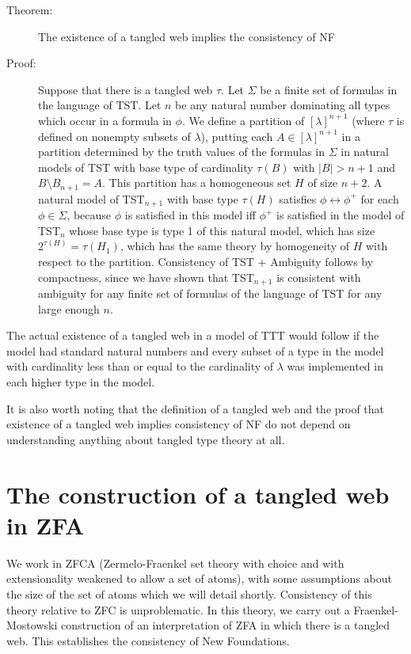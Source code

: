 \documentclass[12pt]{article}
\begin{document}
\begin{description}

\item[Theorem:]  The existence of a tangled web implies the consistency of NF

\item[Proof:]  Suppose that there is a tangled web $\tau$.  Let $\Sigma$ be a finite set of formulas in the language of TST.  Let $n$ be any natural number dominating all types which occur
in a formula in $\phi$.  We define a partition of $[\lambda]^{n+1}$ (where $\tau$ is defined on nonempty subsets of $\lambda$), putting each $A \in [\lambda]^{n+1}$ in a partition
determined by the truth values of the formulas in $\Sigma$ in natural models of TST with base type of cardinality $\tau(B)$ with $|B|>n+1$ and $B \setminus B_{n+1}=A$.  This partition has a homogeneous set $H$ of size $n+2$.  A natural model of TST$_{n+1}$ with base type $\tau(H)$ satisfies $\phi \leftrightarrow \phi^+$ for each $\phi \in \Sigma$, because
$\phi$ is satisfied in this model iff $\phi^+$ is satisfied in the model  of TST$_n$ whose base type is type 1 of this natural model, which has size $2^{\tau(H)} = \tau(H_1)$, which has the same theory by homogeneity of $H$ with respect to the partition.  Consistency of TST + Ambiguity follows by compactness, since we have shown that TST$_{n+1}$ is consistent with ambiguity for any finite set of formulas of the language of TST for any large enough $n$.

\end{description}

The actual existence of a tangled web in a model of TTT would follow if the model had standard natural numbers and every subset of a type in the model with cardinality less than or equal to the cardinality of $\lambda$  was implemented in each higher type in the model.

It is also worth noting that the definition of a tangled web and the proof that existence of a tangled web implies consistency of NF do not depend on understanding anything about tangled type theory at all.

\newpage

\section{The construction of a tangled web in ZFA}

We work in ZFCA (Zermelo-Fraenkel set theory with choice and with extensionality weakened to allow a set of atoms), with some assumptions about the size of the set of atoms which we will detail
shortly.  Consistency of this theory relative to ZFC is unproblematic.  In this theory, we carry out a Fraenkel-Mostowski construction of an interpretation of ZFA in which there is a tangled web.  This establishes the consistency of New Foundations.
\end{document}
